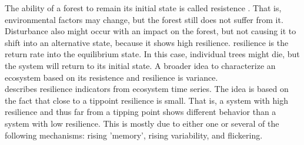 The ability of a forest to remain its initial state is called \gls{resistence} \citep[\textit{cf.} glossary for definitions, too, e.g.][]{keersmaecker2014}. That is, environmental factors may change, but the forest still does not suffer from it. Disturbance also might occur with an impact on the forest, but not causing it to shift into an alternative state, because it shows high \gls{resilience}. \Gls{resilience} is the return rate into the equilibrium state. In this case, individual trees might die, but the system will return to its initial state. A broader idea to characterize an ecosystem based on its \gls{resistence} and \gls{resilience} is \gls{variance}.\\
\cite{dakos2014} describes resilience indicators from ecosystem time series. The idea is based on the fact that close to a \gls{tippoint} resilience is small. That is, a system with high resilience and thus far from a tipping point shows different behavior than a system with low resilience. This is mostly due to either one or several of the following mechanisms: rising 'memory', rising variability, and \gls{flickering}.\\
